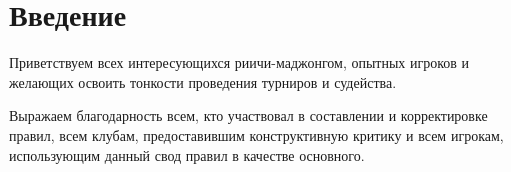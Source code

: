 \section{Введение}

Приветствуем всех интересующихся риичи-маджонгом, опытных игроков и желающих освоить тонкости проведения турниров и судейства. 

Выражаем благодарность всем, кто участвовал в составлении и корректировке правил, всем клубам, предоставившим конструктивную критику и всем игрокам, использующим данный свод правил в качестве основного.
